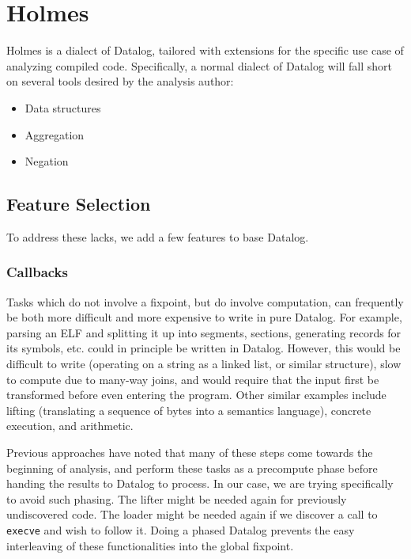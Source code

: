 \chapter{Holmes}
\label{chap:holmes}
Holmes is a dialect of Datalog, tailored with extensions for the specific use case of analyzing compiled code.
Specifically, a normal dialect of Datalog will fall short on several tools desired by the analysis author:
\begin{itemize}
	\item Data structures
	\item Aggregation
	\item Negation
\end{itemize}

\section{Feature Selection}
To address these lacks, we add a few features to base Datalog.
\subsection{Callbacks}
Tasks which do not involve a fixpoint, but do involve computation, can frequently be both more difficult and more expensive to write in pure Datalog.
For example, parsing an ELF and splitting it up into segments, sections, generating records for its symbols, etc. could in principle be written in Datalog.
However, this would be difficult to write (operating on a string as a linked list, or similar structure), slow to compute due to many-way joins, and would require that the input first be transformed before even entering the program.
Other similar examples include lifting (translating a sequence of bytes into a semantics language), concrete execution, and arithmetic.

Previous approaches have noted that many of these steps come towards the beginning of analysis, and perform these tasks as a precompute phase before handing the results to Datalog to process.
In our case, we are trying specifically to avoid such phasing.
The lifter might be needed again for previously undiscovered code.
The loader might be needed again if we discover a call to \texttt{execve} and wish to follow it.
Doing a phased Datalog prevents the easy interleaving of these functionalities into the global fixpoint.

